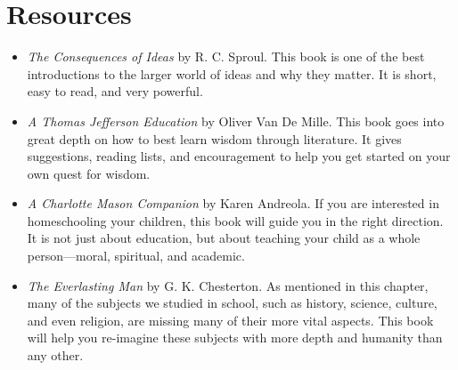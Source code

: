 \section{Resources}

\begin{itemize}
\item
\textit{The Consequences of Ideas} by R. C. Sproul.  This book is
one of the best introductions to the larger world of ideas and why
they matter.  It is short, easy to read, and very powerful.
\item
\textit{A Thomas Jefferson Education} by Oliver Van De Mille.  This
book goes into great depth on how to best learn wisdom through
literature.  It gives suggestions, reading lists, and encouragement
to help you get started on your own quest for wisdom.
\item
\textit{A Charlotte Mason Companion} by Karen Andreola.  If you are 
interested in homeschooling your children, this book will guide
you in the right direction.  It is not just about education, but
about teaching your child as a whole person---moral, spiritual, and
academic.
\item
\textit{The Everlasting Man} by G. K. Chesterton.  As mentioned in
this chapter, many of the subjects we studied in school, such as 
history, science, culture, and even religion, are missing many
of their more vital aspects.  This book will help you re-imagine
these subjects with more depth and humanity than any other.  
\end{itemize}
